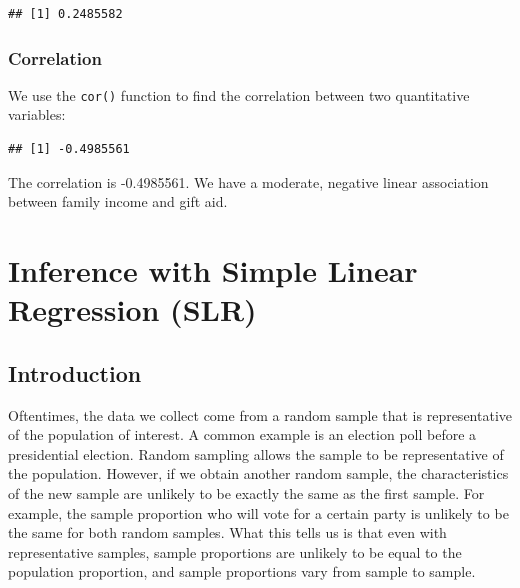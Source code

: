 \documentclass[
]{book}
\newenvironment{Shaded}{\begin{snugshade}}{\end{snugshade}}
\newcommand{\DecValTok}[1]{\textcolor[rgb]{0.00,0.00,0.81}{#1}}
\newcommand{\DocumentationTok}[1]{\textcolor[rgb]{0.56,0.35,0.01}{\textbf{\textit{#1}}}}
\newcommand{\FunctionTok}[1]{\textcolor[rgb]{0.13,0.29,0.53}{\textbf{#1}}}
\newcommand{\NormalTok}[1]{#1}
\newcommand{\SpecialCharTok}[1]{\textcolor[rgb]{0.81,0.36,0.00}{\textbf{#1}}}
\newcommand{\StringTok}[1]{\textcolor[rgb]{0.31,0.60,0.02}{#1}}
\begin{document}
\begin{Shaded}
\end{Shaded}

\begin{verbatim}
## [1] 0.2485582
\end{verbatim}

\hypertarget{correlation-1}{%
\subsection*{Correlation}\label{correlation-1}}

We use the \texttt{cor()} function to find the correlation between two quantitative variables:

\begin{Shaded}
\end{Shaded}

\begin{verbatim}
## [1] -0.4985561
\end{verbatim}

The correlation is -0.4985561. We have a moderate, negative linear association between family income and gift aid.

\hypertarget{inf}{%
\chapter{Inference with Simple Linear Regression (SLR)}\label{inf}}

\hypertarget{introduction-3}{%
\section{Introduction}\label{introduction-3}}

Oftentimes, the data we collect come from a random sample that is representative of the population of interest. A common example is an election poll before a presidential election. Random sampling allows the sample to be representative of the population. However, if we obtain another random sample, the characteristics of the new sample are unlikely to be exactly the same as the first sample. For example, the sample proportion who will vote for a certain party is unlikely to be the same for both random samples. What this tells us is that even with representative samples, sample proportions are unlikely to be equal to the population proportion, and sample proportions vary from sample to sample.
\end{document}

